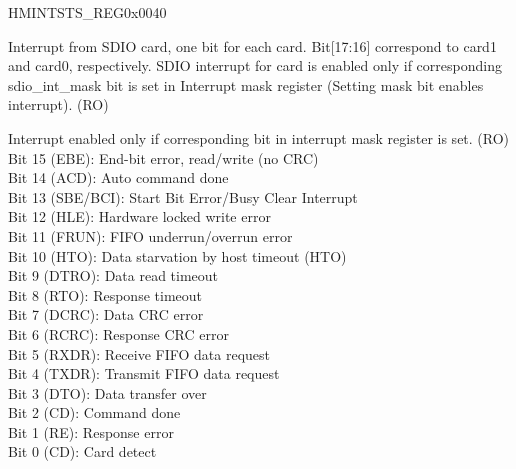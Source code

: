 \begin{register}{H}{MINTSTS\_REG}{0x0040}\label{regdesc:MINTSTSREG}
%
%
%
\regnewline%
\begin{regdesc}\begin{reglist}
\item [SDIO\_INTERRUPT\_MSK]Interrupt from SDIO card, one bit for each card. Bit[17:16] correspond to card1 and card0, respectively. SDIO interrupt for card is enabled only if corresponding sdio\_int\_mask bit is set in Interrupt mask register (Setting mask bit enables interrupt). (RO)
\item [INT\_STATUS\_MSK]Interrupt enabled only if corresponding bit in interrupt mask register is set. (RO)\\
Bit 15 (EBE): End-bit error, read/write (no CRC)\\
Bit 14 (ACD): Auto command done\\
Bit 13 (SBE/BCI): Start Bit Error/Busy Clear Interrupt\\
Bit 12 (HLE): Hardware locked write error \\
Bit 11 (FRUN): FIFO underrun/overrun error\\
Bit 10 (HTO): Data starvation by host timeout (HTO)\\
Bit 9 (DTRO): Data read timeout \\
Bit 8 (RTO): Response timeout \\
Bit 7 (DCRC): Data CRC error \\
Bit 6 (RCRC): Response CRC error \\
Bit 5 (RXDR): Receive FIFO data request \\
Bit 4 (TXDR): Transmit FIFO data request\\
Bit 3 (DTO): Data transfer over \\
Bit 2 (CD): Command done \\
Bit 1 (RE): Response error\\
Bit 0 (CD): Card detect\\
\end{reglist}\end{regdesc}
\end{register}


